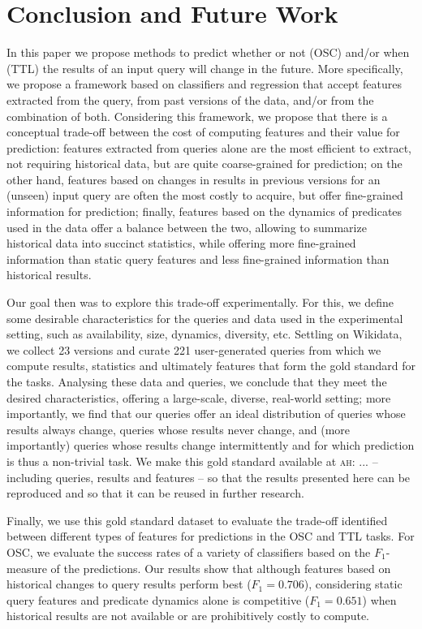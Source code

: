 \documentclass[runningheads]{llncs}
\newcommand{\ah}[1]{{\color{blue}\textsc{ah:} #1}}
\begin{document}
\section{Conclusion and Future Work}
\label{sec:conclusion}

In this paper we propose methods to predict whether or not (OSC) and/or when (TTL) the results of an input query will change in the future. More specifically, we propose a framework based on classifiers and regression that accept features extracted from the query, from past versions of the data, and/or from the combination of both. Considering this framework, we propose that there is a conceptual trade-off between the cost of computing features and their value for prediction: features extracted from queries alone are the most efficient to extract, not requiring historical data, but are quite coarse-grained for prediction; on the other hand, features based on changes in results in previous versions for an (unseen) input query are often the most costly to acquire, but offer fine-grained information for prediction; finally, features based on the dynamics of predicates used in the data offer a balance between the two, allowing to summarize historical data into succinct statistics, while offering more fine-grained information than static query features and less fine-grained information than historical results.

Our goal then was to explore this trade-off experimentally. For this, we define some desirable characteristics for the queries and data used in the experimental setting, such as availability, size, dynamics, diversity, etc. Settling on Wikidata, we collect 23 versions and curate 221 user-generated queries from which we compute results, statistics and ultimately features that form the gold standard for the tasks. Analysing these data and queries, we conclude that they meet the desired characteristics, offering a large-scale, diverse, real-world setting; more importantly, we find that our queries offer an ideal distribution of queries whose results always change, queries whose results never change, and (more importantly) queries whose results change intermittently and for which prediction is thus a non-trivial task. We make this gold standard available at \ah{...} -- including queries, results and features -- so that the results presented here can be reproduced and so that it can be reused in further research.

Finally, we use this gold standard dataset to evaluate the trade-off identified between different types of features for predictions in the OSC and TTL tasks. For OSC, we evaluate the success rates of a variety of classifiers based on the $F_1$-measure of the predictions. Our results show that although features based on historical changes to query results perform best ($F_1 = 0.706$), considering static query features and predicate dynamics alone is competitive ($F_1 =0.651$) when historical results are not available or are prohibitively costly to compute.    
\end{document}
